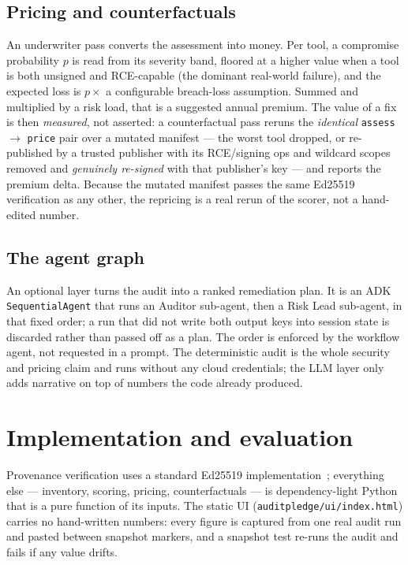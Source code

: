\documentclass[11pt]{article}
\begin{document}
\subsection{Pricing and counterfactuals}
An underwriter pass converts the assessment into money. Per tool, a compromise probability
$p$ is read from its severity band, floored at a higher value when a tool is both unsigned and
RCE-capable (the dominant real-world failure), and the expected loss is $p \times$ a
configurable breach-loss assumption. Summed and multiplied by a risk load, that is a suggested
annual premium. The value of a fix is then \emph{measured}, not asserted: a counterfactual pass
reruns the \emph{identical} \texttt{assess} $\rightarrow$ \texttt{price} pair over a mutated
manifest --- the worst tool dropped, or re-published by a trusted publisher with its RCE/signing
ops and wildcard scopes removed and \emph{genuinely re-signed} with that publisher's key --- and
reports the premium delta. Because the mutated manifest passes the same Ed25519 verification as
any other, the repricing is a real rerun of the scorer, not a hand-edited number.

\subsection{The agent graph}
An optional layer turns the audit into a ranked remediation plan. It is an
ADK~\cite{adk} \texttt{SequentialAgent} that runs an Auditor sub-agent, then a Risk Lead
sub-agent, in that fixed order; a run that did not write both output keys into session state is
discarded rather than passed off as a plan. The order is enforced by the workflow agent, not
requested in a prompt. The deterministic audit is the whole security and pricing claim and runs
without any cloud credentials; the LLM layer only adds narrative on top of numbers the code
already produced.

\section{Implementation and evaluation}
Provenance verification uses a standard Ed25519 implementation~\cite{ed25519}; everything else
--- inventory, scoring, pricing, counterfactuals --- is dependency-light Python that is a pure
function of its inputs. The static UI (\texttt{auditpledge/ui/index.html}) carries no
hand-written numbers: every figure is captured from one real audit run and pasted between
snapshot markers, and a snapshot test re-runs the audit and fails if any value drifts.
\end{document}
